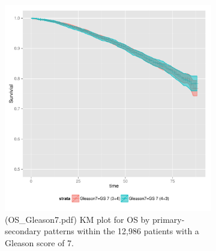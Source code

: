 \begin{figure}
  \begin{subfigure}[t]{0.48\textwidth}
\begin{knitrout}
\color{fgcolor}

{\centering \includegraphics[width=\maxwidth]{figure/OS_Gleason7} 

}



\end{knitrout}

    \caption{(OS\_Gleason7.pdf) KM plot for OS by primary-secondary patterns
    within the 12,986 patients with a
    Gleason score of 7.}
    \label{fig:primary_secondary_km_7os}
  \end{subfigure}
  ~ 
  \begin{subfigure}[t]{0.48\textwidth}
\begin{knitrout}
\color{fgcolor}


\end{knitrout}
\end{subfigure}
\end{figure}
